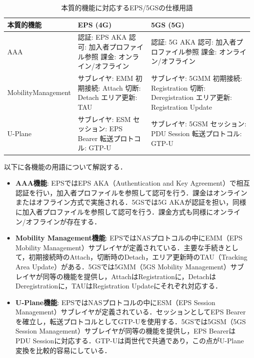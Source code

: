 \begin{table}[htbp]
\centering
\caption{本質的機能に対応するEPS/5GSの仕様用語}
\label{tab:function_terminology}
\begin{tabular}{|p{3cm}|p{5.5cm}|p{5.5cm}|}
\hline
\textbf{本質的機能} & \textbf{EPS (4G)} & \textbf{5GS (5G)} \\
\hline
AAA &
認証: EPS AKA\newline
認可: 加入者プロファイル参照\newline
課金: オンライン/オフライン &
認証: 5G AKA\newline
認可: 加入者プロファイル参照\newline
課金: オンライン/オフライン \\
\hline
Mobility\newline Management &
サブレイヤ: EMM\newline
初期接続: Attach\newline
切断: Detach\newline
エリア更新: TAU &
サブレイヤ: 5GMM\newline
初期接続: Registration\newline
切断: Deregistration\newline
エリア更新: Registration Update \\
\hline
U-Plane &
サブレイヤ: ESM\newline
セッション: EPS Bearer\newline
転送プロトコル: GTP-U &
サブレイヤ: 5GSM\newline
セッション: PDU Session\newline
転送プロトコル: GTP-U \\
\hline
\end{tabular}
\end{table}

以下に各機能の用語について解説する．

\begin{itemize}
  \item \textbf{AAA機能}: EPSではEPS AKA（Authentication and Key Agreement）で相互認証を行い，加入者プロファイルを参照して認可を行う．課金はオンラインまたはオフライン方式で実施される．5GSでは5G AKAが認証を担い，同様に加入者プロファイルを参照して認可を行う．課金方式も同様にオンライン/オフラインが存在する．
  \item \textbf{Mobility Management機能}: EPSではNASプロトコルの中にEMM（EPS Mobility Management）サブレイヤが定義されている．主要な手続きとして，初期接続時のAttach，切断時のDetach，エリア更新時のTAU（Tracking Area Update）がある．5GSでは5GMM（5GS Mobility Management）サブレイヤが同等の機能を提供し，AttachはRegistrationに，DetachはDeregistrationに，TAUはRegistration Updateにそれぞれ対応する．
  \item \textbf{U-Plane機能}: EPSではNASプロトコルの中にESM（EPS Session Management）サブレイヤが定義されている．セッションとしてEPS Bearerを確立し，転送プロトコルとしてGTP-Uを使用する．5GSでは5GSM（5GS Session Management）サブレイヤが同等の機能を提供し，EPS BearerはPDU Sessionに対応する．GTP-Uは両世代で共通であり，この点がU-Plane変換を比較的容易にしている．
\end{itemize}

